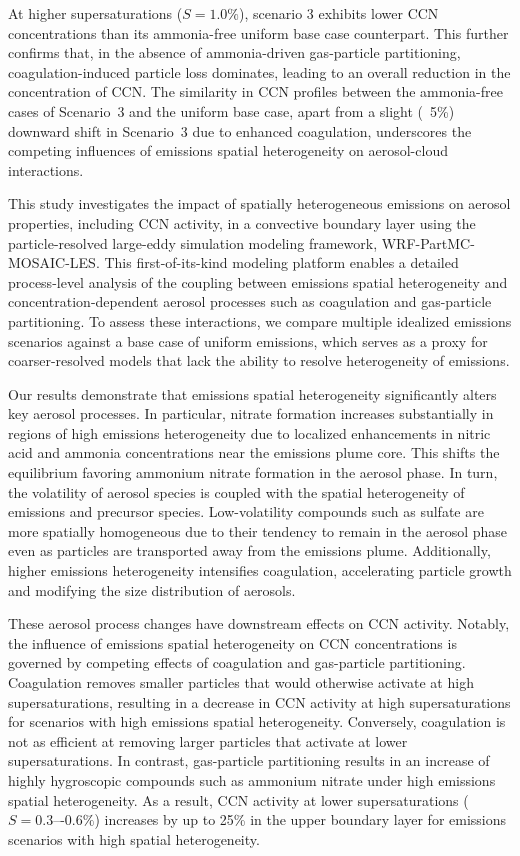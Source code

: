 \documentclass[journal abbreviation, manuscript]{copernicus}
\begin{document}
At higher supersaturations ($S=1.0\%$), scenario 3 exhibits lower CCN
concentrations than its ammonia-free uniform base case
counterpart. This further confirms that, in the absence of
ammonia-driven gas-particle partitioning, coagulation-induced particle
loss dominates, leading to an overall reduction in the concentration of 
CCN. The similarity in CCN profiles between the ammonia-free
cases of Scenario~3 and the uniform base case, apart from a slight
(~5\%) downward shift in Scenario~3 due to enhanced coagulation,
underscores the competing influences of emissions spatial
heterogeneity on aerosol-cloud interactions.

\conclusions  %

This study investigates the impact of spatially heterogeneous
emissions on aerosol properties, including CCN activity, in a
convective boundary layer using the particle-resolved large-eddy
simulation modeling framework, WRF-PartMC-MOSAIC-LES. This
first-of-its-kind modeling platform enables a detailed process-level
analysis of the coupling between emissions spatial heterogeneity and
concentration-dependent aerosol processes such as coagulation and
gas-particle partitioning. To assess these interactions, we compare
multiple idealized emissions scenarios against a base case of uniform
emissions, which serves as a proxy for coarser-resolved models that
lack the ability to resolve heterogeneity of emissions.

Our results demonstrate that emissions spatial heterogeneity
significantly alters key aerosol processes. In particular, nitrate
formation increases substantially in regions of high emissions
heterogeneity due to localized enhancements in nitric acid and ammonia
concentrations near the emissions plume core. This shifts the
equilibrium favoring ammonium nitrate formation in the aerosol
phase. In turn, the volatility of aerosol species is coupled with the
spatial heterogeneity of emissions and precursor species.
Low-volatility compounds such as sulfate are more spatially
homogeneous due to their tendency to remain in the aerosol phase even
as particles are transported away from the emissions plume.
Additionally, higher emissions heterogeneity intensifies coagulation,
accelerating particle growth and modifying the size distribution of
aerosols.

These aerosol process changes have downstream effects on CCN
activity. Notably, the influence of emissions spatial heterogeneity on
CCN concentrations is governed by competing effects of coagulation and
gas-particle partitioning. Coagulation removes smaller particles that
would otherwise activate at high supersaturations, resulting in a
decrease in CCN activity at high supersaturations for scenarios with
high emissions spatial heterogeneity. Conversely, coagulation is not
as efficient at removing larger particles that activate at lower
supersaturations. In contrast, gas-particle partitioning results in an
increase of highly hygroscopic compounds such as ammonium nitrate
under high emissions spatial heterogeneity. As a result, CCN activity
at lower supersaturations ($S = 0.3\mbox{–-}0.6\%$) increases by up to
25\% in the upper boundary layer for emissions scenarios with high
spatial heterogeneity.
\end{document}
